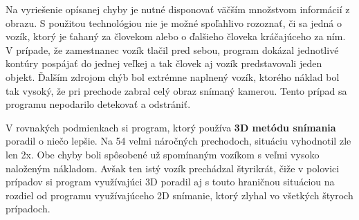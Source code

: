 Na vyriešenie opísanej chyby je nutné disponovať väčším množstvom informácií z obrazu. S použitou technológiou nie je možné spoľahlivo rozoznať, či sa jedná o vozík, ktorý je ťahaný za človekom alebo o ďalšieho človeka kráčajúceho za ním. V prípade, že zamestnanec vozík tlačil pred sebou, program dokázal jednotlivé kontúry pospájať do jednej veľkej a tak človek aj vozík predstavovali jeden objekt. Ďalším zdrojom chýb bol extrémne naplnený vozík, ktorého náklad bol tak vysoký, že pri prechode zabral celý obraz snímaný kamerou. Tento prípad sa programu nepodarilo detekovať a odstrániť.

V rovnakých podmienkach si program, ktorý používa \textbf{3D metódu snímania} poradil o niečo lepšie. Na 54 veľmi náročných prechodoch, situáciu vyhodnotil zle len 2x. Obe chyby boli spôsobené už spomínaným vozíkom s veľmi vysoko naloženým nákladom. Avšak ten istý vozík prechádzal štyrikrát, čiže v polovici prípadov si program využívajúci 3D poradil aj s touto hraničnou situáciou na rozdiel od programu využívajúceho 2D snímanie, ktorý zlyhal vo všetkých štyroch prípadoch. 

